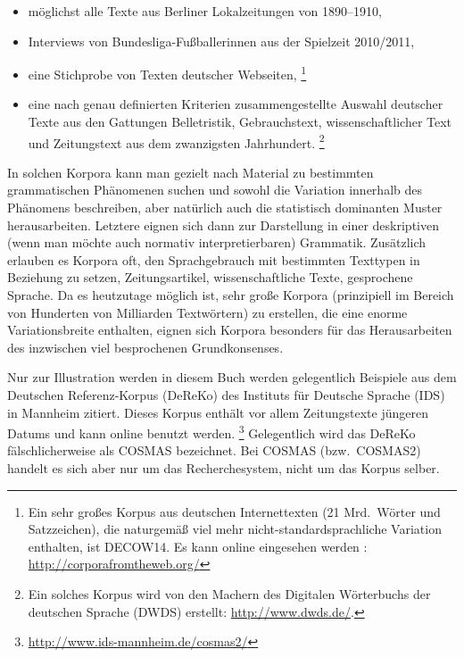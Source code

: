 
\begin{itemize}\Lf
  \item möglichst alle Texte aus Berliner Lokalzeitungen von 1890--1910,
  \item Interviews von Bundesliga-Fußballerinnen aus der Spielzeit 2010\slash 2011,
  \item eine Stichprobe von Texten deutscher Webseiten,%
		\footnote{Ein sehr großes Korpus aus deutschen Internettexten (21 Mrd.\ Wörter und Satzzeichen), die naturgemäß viel mehr nicht-standardsprachliche Variation enthalten, ist DECOW14.
		Es kann online eingesehen werden \citep{SchaeferBildhauer2012a}: \url{http://corporafromtheweb.org/}}
  \item eine nach genau definierten Kriterien zusammengestellte Auswahl deutscher Texte aus den Gattungen Belletristik, Gebrauchstext, wissenschaftlicher Text und Zeitungstext aus dem zwanzigsten Jahrhundert.%
		\footnote{Ein solches Korpus wird von den Machern des Digitalen Wörterbuchs der deutschen Sprache (DWDS) erstellt: \url{http://www.dwds.de/}.}
\end{itemize}

In solchen Korpora kann man gezielt nach Material zu bestimmten grammatischen Phänomenen suchen und sowohl die Variation innerhalb des Phänomens beschreiben, aber natürlich auch die statistisch dominanten Muster herausarbeiten.
Letztere eignen sich dann zur Darstellung in einer deskriptiven (wenn man möchte auch normativ interpretierbaren) Grammatik.
Zusätzlich erlauben es Korpora oft, den Sprachgebrauch mit bestimmten Texttypen in Beziehung zu setzen, \zB Zeitungsartikel, wissenschaftliche Texte, gesprochene Sprache.
Da es heutzutage möglich ist, sehr große Korpora (prinzipiell im Bereich von Hunderten von Milliarden Textwörtern) zu erstellen, die eine enorme Variationsbreite enthalten, eignen sich Korpora besonders für das Herausarbeiten des inzwischen viel besprochenen Grundkonsenses.

Nur zur Illustration werden in diesem Buch werden gelegentlich Beispiele aus dem Deutschen Referenz-Korpus (DeReKo) des Instituts für Deutsche Sprache (IDS) in Mannheim zitiert.
Dieses Korpus enthält vor allem Zeitungstexte jüngeren Datums und kann online benutzt werden.%
\footnote{\url{http://www.ids-mannheim.de/cosmas2/}}
Gelegentlich wird das DeReKo fälschlicherweise als COSMAS bezeichnet.
Bei COSMAS (bzw.\ COSMAS2) handelt es sich aber nur um das Recherchesystem, nicht um das Korpus selber.

